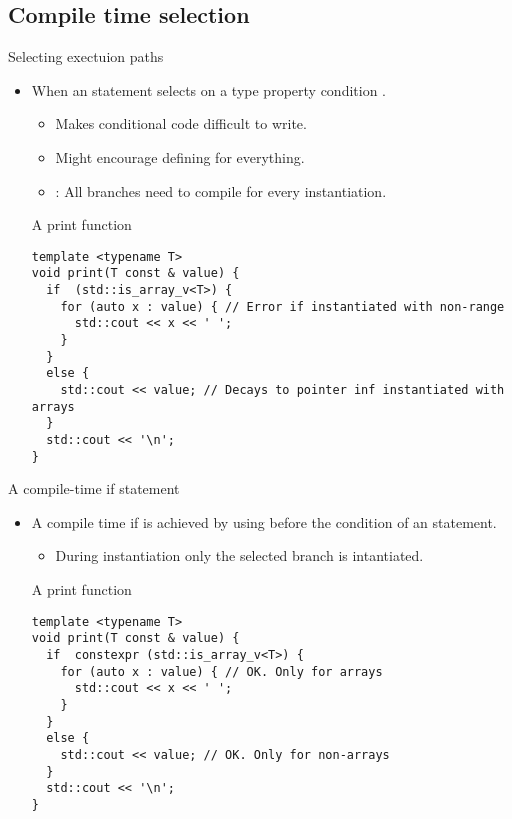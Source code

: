 \subsection{Compile time selection}

\begin{frame}[t,fragile]{Selecting exectuion paths}
\begin{itemize}
  \item When an  statement selects on a type property 
        condition .
    \begin{itemize}
      \item Makes conditional code difficult to write.
      \item Might encourage defining  for everything.
      \item {}: All branches need to compile for every instantiation.
    \end{itemize}

\begin{block}{A print function}
\begin{lstlisting}[basicstyle=\tiny]
template <typename T>
void print(T const & value) {
  if  (std::is_array_v<T>) {
    for (auto x : value) { // Error if instantiated with non-range
      std::cout << x << ' ';
    }
  }
  else {
    std::cout << value; // Decays to pointer inf instantiated with arrays
  }
  std::cout << '\n';
}
\end{lstlisting}
\end{block}

\end{itemize}
\end{frame}

\begin{frame}[t,fragile]{A compile-time if statement}
\begin{itemize}
  \item A compile time if is achieved by using  before the condition
        of an  statement.
    \begin{itemize}
      \item During instantiation only the selected branch is intantiated.
    \end{itemize}

\begin{block}{A print function}
\begin{lstlisting}[basicstyle=\tiny]
template <typename T>
void print(T const & value) {
  if  constexpr (std::is_array_v<T>) {
    for (auto x : value) { // OK. Only for arrays
      std::cout << x << ' ';
    }
  }
  else {
    std::cout << value; // OK. Only for non-arrays
  }
  std::cout << '\n';
}
\end{lstlisting}
\end{block}

\end{itemize}
\end{frame}
